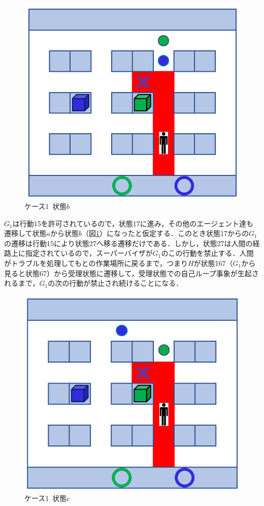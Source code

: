 \begin{figure}[!t]
    \centering
    \includegraphics[scale=0.3]{figures/HITL1_case1_b.png}
    \caption{ケース1\ 状態$b$}
    \label{fig:HITL1_case1_b}
\end{figure}

$G_1$は行動15を許可されているので，状態17に進み，その他のエージェント達も遷移して状態$a$から状態$b$（図\ref{fig:HITL1_case1_b}）になったと仮定する．このとき状態17からの$G_1$の遷移は行動15により状態27へ移る遷移だけである．しかし，状態27は人間の経路上に指定されているので，スーパーバイザが$G_1$のこの行動を禁止する．人間がトラブルを処理してもとの作業場所に戻るまで，つまり$H$が状態167（$G_1$から見ると状態67）から受理状態に遷移して，受理状態での自己ループ事象が生起されるまで，$G_1$の次の行動が禁止され続けることになる．

\begin{figure}[!t]
    \centering
    \includegraphics[scale=0.3]{figures/HITL1_case1_c.png}
    \caption{ケース1\ 状態$c$}
    \label{fig:HITL1_case1_c}
\end{figure}

